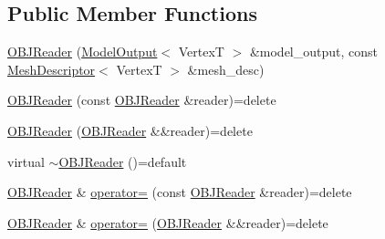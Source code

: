 \subsection*{Public Member Functions}
\begin{DoxyCompactItemize}
\item 
\hyperlink{classmage_1_1_o_b_j_reader_a87c63bd4beb00ce03be5395a37d2a0ac}{O\+B\+J\+Reader} (\hyperlink{structmage_1_1_model_output}{Model\+Output}$<$ VertexT $>$ \&model\+\_\+output, const \hyperlink{structmage_1_1_mesh_descriptor}{Mesh\+Descriptor}$<$ VertexT $>$ \&mesh\+\_\+desc)
\item 
\hyperlink{classmage_1_1_o_b_j_reader_a8864bc1ca0520bf90e216415db772bbb}{O\+B\+J\+Reader} (const \hyperlink{classmage_1_1_o_b_j_reader}{O\+B\+J\+Reader} \&reader)=delete
\item 
\hyperlink{classmage_1_1_o_b_j_reader_ab25803656fb224d94227c1c121c733ee}{O\+B\+J\+Reader} (\hyperlink{classmage_1_1_o_b_j_reader}{O\+B\+J\+Reader} \&\&reader)=delete
\item 
virtual \hyperlink{classmage_1_1_o_b_j_reader_ad6087ff608be5a45559957a076f910e2}{$\sim$\+O\+B\+J\+Reader} ()=default
\item 
\hyperlink{classmage_1_1_o_b_j_reader}{O\+B\+J\+Reader} \& \hyperlink{classmage_1_1_o_b_j_reader_a62e516060267f828c5aa1a3f23dcf55d}{operator=} (const \hyperlink{classmage_1_1_o_b_j_reader}{O\+B\+J\+Reader} \&reader)=delete
\item 
\hyperlink{classmage_1_1_o_b_j_reader}{O\+B\+J\+Reader} \& \hyperlink{classmage_1_1_o_b_j_reader_ac795c3b1d19ecf38735b76bc5b97fa80}{operator=} (\hyperlink{classmage_1_1_o_b_j_reader}{O\+B\+J\+Reader} \&\&reader)=delete
\end{DoxyCompactItemize}
